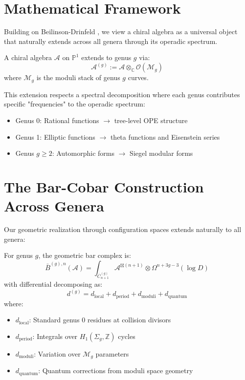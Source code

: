 \section{Mathematical Framework}

Building on Beilinson-Drinfeld \cite{BD}, we view a chiral algebra as a universal object
that naturally extends across all genera through its operadic spectrum.

\begin{definition}
A chiral algebra $\mathcal{A}$ on $\mathbb{P}^1$ extends to genus $g$ via:
$$\mathcal{A}^{(g)} := \mathcal{A} \otimes_{\mathbb{C}} \mathcal{O}(\mathcal{M}_g)$$
where $\mathcal{M}_g$ is the moduli stack of genus $g$ curves.
\end{definition}

This extension respects a spectral decomposition where each genus contributes specific
"frequencies" to the operadic spectrum:

\begin{itemize}
\item Genus 0: Rational functions $\to$ tree-level OPE structure
\item Genus 1: Elliptic functions $\to$ theta functions and Eisenstein series
\item Genus $g \geq 2$: Automorphic forms $\to$ Siegel modular forms
\end{itemize}

\section{The Bar-Cobar Construction Across Genera}

Our geometric realization through configuration spaces extends naturally to all genera:

\begin{theorem}
For genus $g$, the geometric bar complex is:
$$\bar{B}^{(g),n}(\mathcal{A}) = \int_{\overline{C}_{n+1}^{(g)}} \mathcal{A}^{\boxtimes(n+1)} \otimes \Omega^{n+3g-3}(\log D)$$
with differential decomposing as:
$$d^{(g)} = d_{\text{local}} + d_{\text{period}} + d_{\text{moduli}} + d_{\text{quantum}}$$
where:
\begin{itemize}
\item $d_{\text{local}}$: Standard genus 0 residues at collision divisors
\item $d_{\text{period}}$: Integrals over $H_1(\Sigma_g, \mathbb{Z})$ cycles
\item $d_{\text{moduli}}$: Variation over $\mathcal{M}_g$ parameters  
\item $d_{\text{quantum}}$: Quantum corrections from moduli space geometry
\end{itemize}
\end{theorem}

